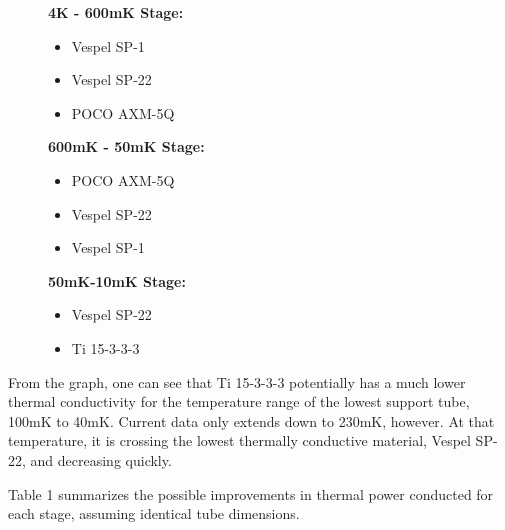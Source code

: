\documentclass{report}
\begin{document}
\begin{figure}[htb]
\centering
\begin{minipage}[t]{.3\textwidth}
\textbf{4K - 600mK Stage:}
\begin{itemize}
\item Vespel SP-1
\item Vespel SP-22
\item POCO AXM-5Q
\end{itemize}
\end{minipage}
\begin{minipage}[t]{.3\textwidth}
\textbf{600mK - 50mK Stage:}
\begin{itemize}
\item POCO AXM-5Q
\item Vespel SP-22
\item Vespel SP-1
\end{itemize}
\end{minipage}
\begin{minipage}[t]{.3\textwidth}
\textbf{50mK-10mK Stage:}
\begin{itemize}
\item Vespel SP-22
\item Ti 15-3-3-3
\end{itemize}
\end{minipage}
\end{figure}

From the graph, one can see that Ti 15-3-3-3 potentially has a much lower thermal
conductivity for the temperature range of the lowest support tube, 100mK to 40mK.
Current data only extends down to 230mK, however. At that temperature, it is crossing
the lowest thermally conductive material, Vespel SP-22, and decreasing quickly.

Table 1 summarizes the possible improvements in thermal power conducted for each stage,
assuming identical tube dimensions.
\end{document}
